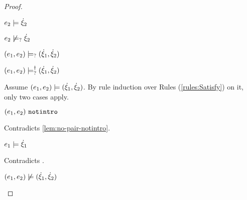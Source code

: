 \begin{proof}
\begin{byCases}
\begin{byCases}
\begin{byCases}
\begin{pfsteps*}
            \item $e_2 \models \dot{\xi}_2$  
            \item $e_2 \not\models_{?} \dot{\xi}_2$  
            \item $(e_1 , e_2) \models_{?} (\dot{\xi}_1 , \dot{\xi}_2)$  
            \item $(e_1 , e_2) \models_{?}^{\dag} (\dot{\xi}_1 , \dot{\xi}_2)$ 
            \end{pfsteps*}
            Assume $(e_1 , e_2) \models (\dot{\xi}_1 , \dot{\xi}_2)$. By rule induction over Rules (\ref{rules:Satisfy}) on it, only two cases apply. 
           \begin{byCases}
            \item[\text{(\ref{rule:CSNotIntroPair})}]
                \begin{pfsteps*}
                \item $(e_1 , e_2) ~\mathtt{notintro}$ 
                \end{pfsteps*}
                Contradicts \autoref{lem:no-pair-notintro}.
            \item[\text{(\ref{rule:CSPair})}]
                \begin{pfsteps*}
                \item $e_1 \models \dot{\xi}_1$ 
                \end{pfsteps*}
                Contradicts .
            \end{byCases}
            \begin{pfsteps*}
            \item $(e_1 , e_2) \not\models (\dot{\xi}_1 , \dot{\xi}_2)$  
            \end{pfsteps*}
            

\end{byCases}
\end{byCases}
\end{byCases}
\end{proof}

